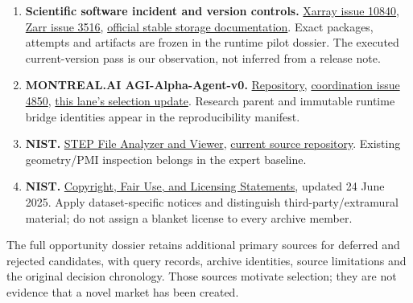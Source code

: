 \documentclass[
  11pt,
]{article}
\begin{document}
\begin{enumerate}
  \textbf{AGI Alpha Agent vision.}
  \href{https://agialphaagent.com/}{agialphaagent.com}. Motivation only.
  The quoted USD15 quadrillion and IP superlatives are external
  promotional claims, not validated findings or forecast inputs.
\item
  \textbf{Scientific software incident and version controls.}
  \href{https://github.com/pydata/xarray/issues/10840}{Xarray issue
  10840},
  \href{https://github.com/zarr-developers/zarr-python/issues/3516}{Zarr
  issue 3516},
  \href{https://zarr.readthedocs.io/en/stable/api/zarr/storage/index.html}{official
  stable storage documentation}. Exact packages, attempts and artifacts
  are frozen in the runtime pilot dossier. The executed current-version
  pass is our observation, not inferred from a release note.
\item
  \textbf{MONTREAL.AI AGI-Alpha-Agent-v0.}
  \href{https://github.com/MontrealAI/AGI-Alpha-Agent-v0}{Repository},
  \href{https://github.com/MontrealAI/AGI-Alpha-Agent-v0/issues/4850}{coordination
  issue 4850},
  \href{https://github.com/MontrealAI/AGI-Alpha-Agent-v0/issues/4850\#issuecomment-6447631102}{this
  lane's selection update}. Research parent and immutable runtime bridge
  identities appear in the reproducibility manifest.
\item
  \textbf{NIST.}
  \href{https://www.nist.gov/services-resources/software/step-file-analyzer-and-viewer}{STEP
  File Analyzer and Viewer},
  \href{https://github.com/usnistgov/SFA}{current source repository}.
  Existing geometry/PMI inspection belongs in the expert baseline.
\item
  \textbf{NIST.} \href{https://www.nist.gov/open/license}{Copyright,
  Fair Use, and Licensing Statements}, updated 24 June 2025. Apply
  dataset-specific notices and distinguish third-party/extramural
  material; do not assign a blanket license to every archive member.
\end{enumerate}

The full opportunity dossier retains additional primary sources for
deferred and rejected candidates, with query records, archive
identities, source limitations and the original decision chronology.
Those sources motivate selection; they are not evidence that a novel
market has been created.
\end{document}
